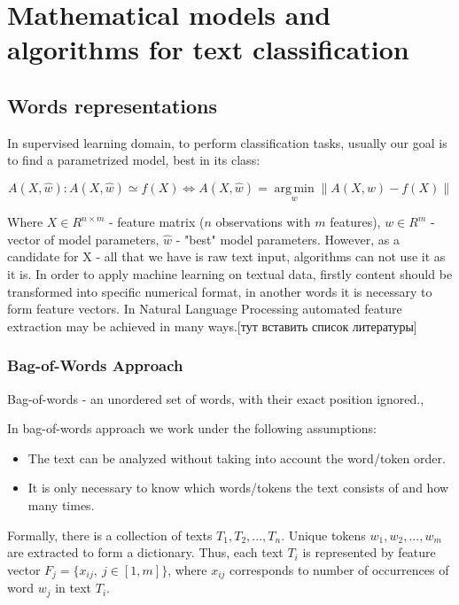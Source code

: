\chapter{Mathematical models and algorithms for text classification} \label{chapt2}

\section{Words representations} \label{sect2_1}


In supervised learning domain, to perform classification tasks, usually our goal is to find a parametrized model, best in its class: 

\begin{equation}
\label{eq:equation1}
A(X, \hat{w}): A(X, \hat{w}) \simeq f(X) \Leftrightarrow A(X, \hat{w}) = \operatorname*{arg\,min}_w \left\|A(X, w) - f(X)\right\|
\end{equation}

Where $X \in R^{ n\times m}$ - feature matrix ($n$ observations with $m$ features), $w \in R^{m}$ - vector of model parameters, $\hat{w}$ - "best" model parameters. However, as a candidate for X - all that we have is raw text input, algorithms can not use it as it is. In order to apply machine learning on textual data, firstly content should be transformed into specific numerical format, in another words it is necessary to form feature vectors. In Natural Language Processing automated feature extraction may be achieved in many ways.[тут вставить список литературы]

\subsection{Bag-of-Words Approach} \label{subsect2_1_1}

Bag-of-words - an unordered set of words, with their exact position ignored.\cite[p.641]{jurafsky}, 


\noindent In bag-of-words approach we work under the following assumptions:
\begin{itemize}
	\item The text can be analyzed without taking into account the word/token order.
	\item It is only necessary to know which words/tokens the text consists of and how many times.
\end{itemize}

Formally, there is a collection of texts $T_1, T_2, ... , T_n$. Unique tokens $w_1, w_2, ..., w_m$ are extracted to form a dictionary. Thus, each text $T_i$ is represented by feature vector $F_j = \{x_{ij},\ j \in [1,m]\}$, where $x_{ij}$ corresponds to number of occurrences of word $w_j$ in text $T_i$.

